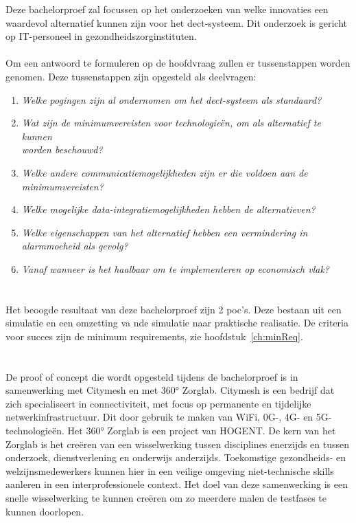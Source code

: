 Deze bachelorproef zal focussen op het onderzoeken van welke innovaties een waardevol alternatief kunnen zijn voor het \gls{dect}-systeem. Dit onderzoek is gericht op IT-personeel in gezondheidszorginstituten.\\\\

Om een antwoord te formuleren op de hoofdvraag zullen er tussenstappen worden genomen. Deze tussenstappen zijn opgesteld als deelvragen:

\begin{enumerate}
  \item \textit{Welke pogingen zijn al ondernomen om het \gls{dect}-systeem als standaard?}
  \item \textit{Wat zijn de minimumvereisten voor technologieën, om als alternatief te kunnen \\worden beschouwd?}
  \item \textit{Welke andere communicatiemogelijkheden zijn er die voldoen aan de minimumvereisten?}
  \item \textit{Welke mogelijke data-integratiemogelijkheden hebben de alternatieven?}
  \item \textit{Welke eigenschappen van het alternatief hebben een vermindering in alarmmoeheid als gevolg?}
  \item \textit{Vanaf wanneer is het haalbaar om te implementeren op economisch vlak?}
\end{enumerate}

\section{}%
\label{sec:onderzoeksdoelstelling}


Het beoogde resultaat van deze bachelorproef zijn 2 \gls{poc}'s. Deze bestaan uit een simulatie en een omzetting va nde simulatie naar praktische realisatie. De criteria voor succes zijn de minimum requirements, zie hoofdstuk~\ref{ch:minReq}.

\section{}%
\label{sec:opzet-bachelorproef}


De proof of concept die wordt opgesteld tijdens de bachelorproef is in samenwerking met Citymesh en met 360° Zorglab. Citymesh is een bedrijf dat zich specialiseert in connectiviteit, met focus op permanente en tijdelijke netwerkinfrastructuur. Dit door gebruik te maken van WiFi, 0G-, 4G- en 5G-technologieën. \autocite{Citymesh2024} Het 360° Zorglab is een project van HOGENT. De kern van het Zorglab is het creëren van een wisselwerking tussen disciplines enerzijds en tussen onderzoek, dienstverlening en onderwijs anderzijds. Toekomstige gezondheids- en welzijnsmedewerkers kunnen hier in een veilige omgeving niet-technische skills aanleren in een interprofessionele context. \autocite{HOGENT2024} Het doel van deze samenwerking is een snelle wisselwerking te kunnen creëren om zo meerdere malen de testfases te kunnen doorlopen. 

